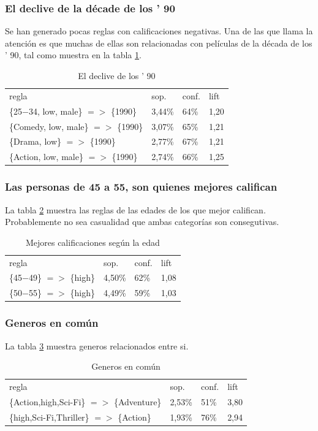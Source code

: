 \documentclass[journal]{IEEEtran}
\begin{document}
\subsubsection{El declive de la décade de los ' 90}
Se han generado pocas reglas con calificaciones negativas. Una de las
que llama la atención es que muchas de ellas son relacionadas con películas
de la década de los ' 90, tal como muestra en la tabla \ref{table_year_90}.
\begin{table}[ht!]
\caption{El declive de los ' 90}
\label{table_year_90}
\centering
\begin{tabular}{l l l l }
regla & sop. & conf. & lift \\
\{25$-$34, low, male\} $=$$>$ \{1990\} & 3,44\% & 64\% & 1,20 \\
\{Comedy, low, male\} $=$$>$ \{1990\} & 3,07\% & 65\% & 1,21 \\
\{Drama, low\} $=$$>$ \{1990\} & 2,77\% & 67\% & 1,21 \\
\{Action, low, male\} $=$$>$ \{1990\} & 2,74\% & 66\% & 1,25 
\end{tabular}
\end{table}

\subsubsection{Las personas de 45 a 55, son quienes mejores califican}
La tabla \ref{table_age} muestra las reglas de las edades de los que
mejor califican. Probablemente no sea casualidad que ambas categorías 
son consegutivas.
\begin{table}[ht!]
\caption{Mejores calificaciones según la edad}
\label{table_age}
\centering
\begin{tabular}{l l l l }
regla & sop. & conf. & lift \\
\{45$-$49\} $=$$>$ \{high\} & 4,50\% & 62\% & 1,08 \\
\{50$-$55\} $=$$>$ \{high\} & 4,49\% & 59\% & 1,03 \\
\end{tabular}
\end{table}

\subsubsection{Generos en común}
La tabla \ref{table_common_genre} muestra generos relacionados 
entre si. 
\begin{table}[ht!]
\caption{Generos en común}
\label{table_common_genre}
\centering
\begin{tabular}{l l l l }
regla & sop. & conf. & lift \\
\{Action,high,Sci-Fi\} $=$$>$ \{Adventure\} & 2,53\% & 51\% & 3,80 \\
\{high,Sci-Fi,Thriller\} $=$$>$ \{Action\} & 1,93\% & 76\% & 2,94 
\end{tabular}
\end{table}
\end{document}
